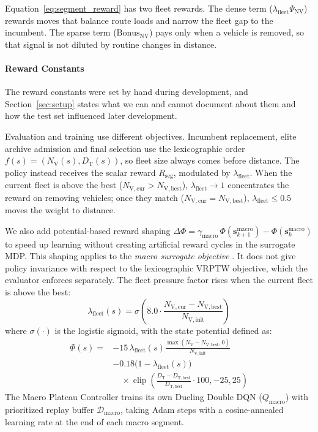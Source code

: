 \documentclass{ieeeaccess}
\newcommand{\NV}{{N_\mathrm{V}}}
\newcommand{\TD}{{D_\mathrm{T}}}
\newcommand{\NVs}[1]{N_{\mathrm{V},\text{#1}}}
\newcommand{\TDs}[1]{D_{\mathrm{T},\text{#1}}}
\begin{document}
Equation~\eqref{eq:segment_reward} has two fleet rewards. The dense term ($\lambda_{\text{fleet}} \Psi_{\mathrm{NV}}$) rewards moves that balance route loads and narrow the fleet gap to the incumbent. The sparse term ($\text{Bonus}_{\mathrm{NV}}$) pays only when a vehicle is removed, so that signal is not diluted by routine changes in distance.

\paragraph{Reward Constants}
The reward constants were set by hand during development, and Section~\ref{sec:setup} states what we can and cannot document about them and how the test set influenced later development.

Evaluation and training use different objectives. Incumbent replacement, elite archive admission and final selection use the lexicographic order $f(s) = (\NV(s), \TD(s))$, so fleet size always comes before distance. The policy instead receives the scalar reward $R_{\text{seg}}$, modulated by $\lambda_{\text{fleet}}$. When the current fleet is above the best ($\NVs{cur} > \NVs{best}$), $\lambda_{\text{fleet}} \to 1$ concentrates the reward on removing vehicles; once they match ($\NVs{cur} = \NVs{best}$), $\lambda_{\text{fleet}} \le 0.5$ moves the weight to distance.

We also add potential-based reward shaping $\Delta \Phi = \gamma_{\text{macro}}\,\Phi(\mathbf{s}_{k+1}^{\text{macro}}) - \Phi(\mathbf{s}_k^{\text{macro}})$ to speed up learning without creating artificial reward cycles in the surrogate MDP. This shaping applies to the \emph{macro surrogate objective} \cite{ng1999policy}. It does not give policy invariance with respect to the lexicographic VRPTW objective, which the evaluator enforces separately. The fleet pressure factor rises when the current fleet is above the best:
\begin{equation}
  \lambda_{\text{fleet}}(s) = \sigma\!\left(8.0 \cdot \frac{\NVs{cur} - \NVs{best}}{\NVs{init}}\right)
  \label{eq:lambda_fleet}
\end{equation}
where $\sigma(\cdot)$ is the logistic sigmoid, with the state potential defined as:
\begin{align}
  \Phi(s) = &-15\,\lambda_{\text{fleet}}(s) \frac{\max(\NV - \NVs{best}, 0)}{\NVs{init}} \nonumber \\
  &- 0.18\bigl(1 - \lambda_{\text{fleet}}(s)\bigr) \nonumber \\
  &\quad \times \operatorname{clip}\!\left(\frac{\TD - \TDs{best}}{\TDs{best}} \cdot 100, -25, 25\right)
  \label{eq:potential_function}
\end{align}
The Macro Plateau Controller trains its own Dueling Double DQN ($Q_{\text{macro}}$) with prioritized replay buffer $\mathcal{D}_{\text{macro}}$, taking Adam steps with a cosine-annealed learning rate at the end of each macro segment.
\end{document}
